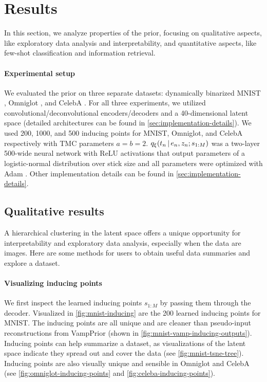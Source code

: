 \section{Results}
In this section, we 
analyze properties of the
\acronym\;prior,
focusing on
qualitative aspects, like exploratory data analysis and interpretability,
and quantitative aspects, like few-shot classification and information retrieval.
\paragraph{Experimental setup} We evaluated
the \acronym\;prior on three separate
datasets: dynamically binarized MNIST \citep{MNIST}, Omniglot \citep{omniglot},
and CelebA \citep{celeba}. 
For all three experiments,
we utilized convolutional/deconvolutional encoders/decoders
and a 40-dimensional
latent space (detailed architectures can be found
in \autoref{sec:implementation-details}).
We used 200, 1000, and 500 inducing points for MNIST, Omniglot, and CelebA respectively 
with TMC parameters $a = b = 2$.
$q_{\xi}(t_n \,|\, e_n, z_n; s_{1:M})$ was a
two-layer 500-wide neural network
with ReLU activations that output parameters of a
logistic-normal distribution over stick size
and all parameters were optimized with Adam \citep{kingma2015adam}.
Other implementation details can be found in \autoref{sec:implementation-details}.

\subsection{Qualitative results}

A hierarchical clustering in the latent space
offers a unique opportunity for interpretability
and exploratory data analysis,
especially when the data are images.
Here are some methods for users to obtain
useful data summaries and explore a dataset.

\paragraph{Visualizing inducing points}
We first inspect the learned inducing points $s_{1:M}$
by passing them through the decoder.
Visualized in \autoref{fig:mnist-inducing}
are the 200 learned inducing points for MNIST.
The inducing points are all unique
and are cleaner than pseudo-input reconstructions from VampPrior (shown in
\autoref{fig:mnist-vamp-inducing-outputs}).
Inducing points can help summarize a
dataset, as visualizations of the latent space
indicate they spread out and cover the data
(see \autoref{fig:mnist-tsne-tree}). Inducing points
are also visually unique and sensible
in Omniglot and CelebA (see
\autoref{fig:omniglot-inducing-points} and \ref{fig:celeba-inducing-points}).

